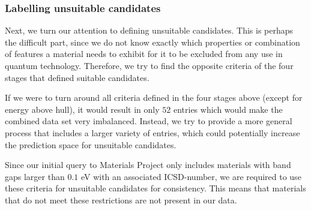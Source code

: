 \begin{table}[!ht]
\centering
\caption{A table that compares two different implementations of the same screen procedure. \citeauthor{Ferrenti2020} extracted information March of $2020$, while we did the extraction during April of $2021$. The adjusted difference is given as our reported entries divided on their reported entries.}
\label{tab:approach-1-suitable-candidates}
\noindent{}
\end{table}

\subsubsection{Labelling unsuitable candidates}

Next, we turn our attention to defining unsuitable candidates. This is perhaps the difficult part, since we do not know exactly which properties or combination of features a material needs to exhibit for it to be excluded from any use in quantum technology. Therefore, we try to find the opposite criteria of the four stages that defined suitable candidates.

If we were to turn around all criteria defined in the four stages above (except for energy above hull), it would result in only $52$ entries which would make the combined data set very imbalanced. Instead, we try to provide a more general process that includes a larger variety of entries, which could potentially increase the prediction space for unsuitable candidates.

Since our initial query to Materials Project only includes materials with band gaps larger than $0.1$ eV with an associated ICSD-number, we are required to use these criteria for unsuitable candidates for consistency. This means that materials that do not meet these restrictions are not present in our data.

